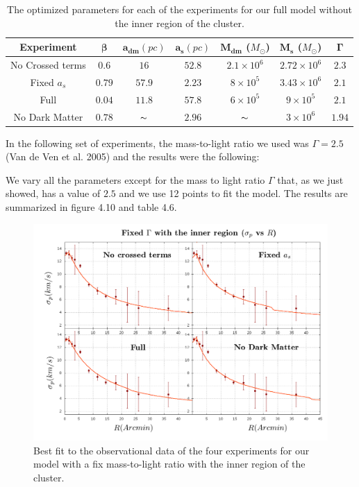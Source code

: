 \begin{table}[H]
\begin{center}
\begin{tabular}{| c| c| c| c| c| c| c|}
    \hline
    \textbf{Experiment} & $\mathbf{\beta}$ & $\mathbf{a_{dm}} (pc)$ & $\mathbf{a_{s}} (pc)$ & $\mathbf{M_{dm}}$ ($M_{\odot}$) & $\mathbf{M_{s}}$ ($M_{\odot}$) & $\mathbf{\Gamma}$\\ \hline
	No Crossed terms & $0.6$ &	$16$ &	$52.8$ &	$2.1 \times 10^{6}$ &	$2.72 \times 10^{6}$ &	$2.3$\\ \hline
	Fixed $a_s$ &	$0.79$ &	$57.9$ &	$2.23$ &	$8 \times 10^{5}$ &	$3.43 \times 10 ^{6}$ &	$2.1$\\ \hline
	Full &	$0.04$ &	$11.8$ &	$57.8$ &	$6 \times 10^{5}$ &	$9 \times 10^{5}$ &	$2.1$\\ \hline
	No Dark Matter &	$0.78$ &	$\thicksim$ & $2.96$ &	$\thicksim$ & $ 3 \times 10^{6}$ & 	$1.94$\\
    \hline
  \end{tabular} 
\caption[Optimized parameters for our full model without the inner region.]{The optimized parameters for each of the experiments for our full model without the inner region of the cluster.}
\end{center}
  
\end{table}

In the following set of experiments, the mass-to-light ratio we used was $\Gamma = 2.5$ (Van de Ven et al. 2005) and the results were the following: 

We vary all the parameters except for the mass to light ratio $\Gamma$ that, as we just showed, has a value of $2.5$ and we use 12 points to fit the model. The results are summarized in figure 4.10 and table 4.6.

\begin{figure}[H]
\centering
\includegraphics[width=15cm]{images/fix_gamma_refinado_12.png}
\caption[Best fit of our model with a fix mass-to-light ratio with the inner region]{Best fit to the observational data of the four experiments for our model with a fix mass-to-light ratio with the inner region of the cluster.}
\end{figure}

